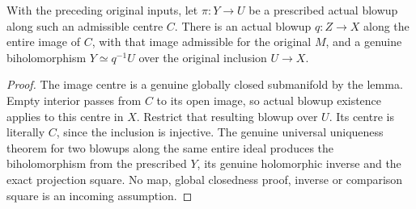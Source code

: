 \begin{theorem}
\label{hir:open-cosupport-actual-step-extension}
\leanok
With the preceding original inputs, let $\pi:Y\to U$ be a prescribed actual
blowup along such an admissible centre $C$.  There is an actual blowup
$q:Z\to X$ along the entire image of $C$, with that image admissible for the
original $M$, and a genuine biholomorphism
$Y\simeq q^{-1}U$ over the original inclusion $U\to X$.
\end{theorem}
\begin{proof}
The image centre is a genuine globally closed submanifold by the lemma.  Empty
interior passes from $C$ to its open image, so actual blowup existence applies
to this centre in $X$.  Restrict that resulting blowup over $U$.  Its centre is
literally $C$, since the inclusion is injective.  The genuine universal
uniqueness theorem for two blowups along the same entire ideal produces the
biholomorphism from the prescribed $Y$, its genuine holomorphic inverse and the
exact projection square.  No map, global closedness proof, inverse or comparison
square is an incoming assumption.
\end{proof}

